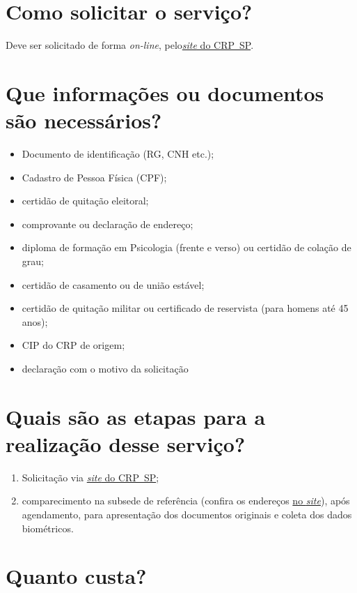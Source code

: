 \section{Como solicitar o serviço?}

Deve ser solicitado de forma \emph{on-line}, pelo\href{https://www.crpsp.org/pagina/view/338}{\emph{site} do CRP~SP}.

\section{Que informações ou documentos são necessários?}

\begin{itemize}
  \item  Documento de identificação (RG, CNH etc.);
  \item  Cadastro de Pessoa Física (CPF);
  \item  certidão de quitação eleitoral;
  \item  comprovante ou declaração de endereço;
  \item  diploma de formação em Psicologia (frente e verso) ou certidão de  colação de grau;
  \item  certidão de casamento ou de união estável;
  \item  certidão de quitação militar ou certificado de reservista (para homens  até 45 anos);
  \item  CIP do CRP de origem;
  \item  declaração com o motivo da solicitação
\end{itemize}

\section{Quais são as etapas para a realização desse serviço?}

\begin{enumerate}
  \item  Solicitação via \href{https://www.crpsp.org/agendamento}{\emph{site}  do CRP~SP};
  \item  comparecimento na subsede de referência (confira os endereços  \href{https://www.crpsp.org/sede/index}{no \emph{site}}), após  agendamento, para apresentação dos documentos originais e coleta dos  dados biométricos.
\end{enumerate}

\section{Quanto custa?}

